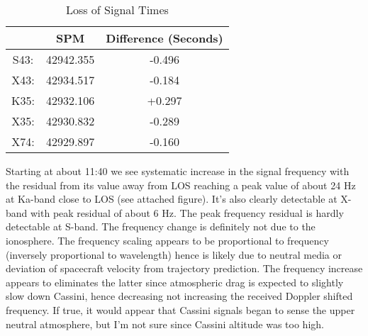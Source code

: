 \documentclass[crop=false,class=article,oneside]{standalone}
\begin{document}
\begin{table}[H]
    \centering
    \caption{Loss of Signal Times}
    \begin{tabular}{c c c} 
        \hline
        & SPM      & Difference (Seconds)    \\ 
        \hline
        S43: & 42942.355 & -0.496    \\
        X43: & 42934.517 & -0.184    \\
        K35: & 42932.106 & +0.297    \\
        X35: & 42930.832 & -0.289    \\
        X74: & 42929.897 & -0.160    \\
        \hline
    \end{tabular}
\end{table}
Starting at about 11:40 we see systematic increase in the signal frequency with the residual from its value away from LOS reaching a peak value of about 24 Hz at Ka-band close to LOS (see attached figure).  It’s also clearly detectable at X-band with peak residual of about 6 Hz. The peak frequency residual is hardly detectable at S-band. The frequency change is definitely not due to the ionosphere. The frequency scaling appears to be proportional to frequency (inversely proportional to wavelength) hence is likely due to neutral media or deviation of spacecraft velocity from trajectory prediction.  The frequency increase appears to eliminates the latter since atmospheric drag is expected to slightly slow down Cassini, hence decreasing not increasing the received Doppler shifted frequency. If true, it would appear that Cassini signals began to sense the upper neutral  atmosphere, but I’m not sure since Cassini altitude was too high.
\end{document}
